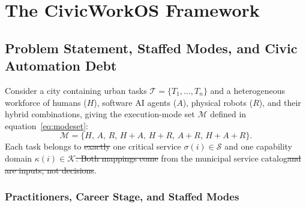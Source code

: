 \documentclass[utf8]{FrontiersinHarvard}
\providecommand{\DIFadd}[1]{{\protect\color{blue}\uwave{#1}}} %
\providecommand{\DIFdel}[1]{{\protect\color{red}\sout{#1}}}                      %
\providecommand{\DIFaddbegin}{} %
\providecommand{\DIFaddend}{} %
\providecommand{\DIFdelbegin}{} %
\providecommand{\DIFdelend}{} %
\begin{document}
	\section{The CivicWorkOS Framework}
	\label{sec:framework}

	\subsection{Problem Statement, Staffed Modes, and Civic Automation Debt}
	\label{sec:problem}

	Consider a city containing urban tasks $\mathcal{T}=\{T_1,\ldots,T_n\}$ and a heterogeneous workforce of humans ($H$), software AI agents ($A$), physical robots ($R$), and their hybrid combinations, giving the execution-mode set $\mathcal{M}$ defined in equation~\eqref{eq:modeset}:
	\begin{equation}
		\mathcal{M}=\{H,\,A,\,R,\,H\!+\!A,\,H\!+\!R,\,A\!+\!R,\,H\!+\!A\!+\!R\}.
		\label{eq:modeset}
	\end{equation}
	Each task belongs to \DIFdelbegin \DIFdel{exactly }\DIFdelend one critical service $\sigma(i)\in\mathcal{S}$ and one capability domain $\kappa(i)\in\mathcal{K}$\DIFdelbegin \DIFdel{. Both mappings come }\DIFdelend \DIFaddbegin \DIFadd{, both taken }\DIFaddend from the municipal service catalog\DIFdelbegin \DIFdel{and are inputs, not decisions}\DIFdelend .

	\subsubsection*{Practitioners, Career Stage, and Staffed Modes}
\end{document}
